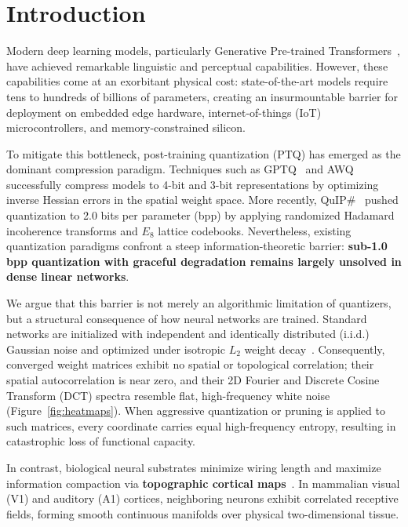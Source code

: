 \documentclass[11pt,a4paper]{article}
\begin{document}
\newpage

\section{Introduction}
\label{sec:intro}

Modern deep learning models, particularly Generative Pre-trained Transformers~\citep[GPT;][]{vaswani2017attention}, have achieved remarkable linguistic and perceptual capabilities. However, these capabilities come at an exorbitant physical cost: state-of-the-art models require tens to hundreds of billions of parameters, creating an insurmountable barrier for deployment on embedded edge hardware, internet-of-things (IoT) microcontrollers, and memory-constrained silicon.

To mitigate this bottleneck, post-training quantization (PTQ) has emerged as the dominant compression paradigm. Techniques such as GPTQ~\citep{frantar2022gptq} and AWQ~\citep{lin2023awq} successfully compress models to 4-bit and 3-bit representations by optimizing inverse Hessian errors in the spatial weight space. More recently, QuIP\#~\citep{chee2024quip} pushed quantization to 2.0 bits per parameter (bpp) by applying randomized Hadamard incoherence transforms and $E_8$ lattice codebooks. 
Nevertheless, existing quantization paradigms confront a steep information-theoretic barrier: \textbf{sub-1.0 bpp quantization with graceful degradation remains largely unsolved in dense linear networks}.

We argue that this barrier is not merely an algorithmic limitation of quantizers, but a structural consequence of how neural networks are trained. Standard networks are initialized with independent and identically distributed (i.i.d.) Gaussian noise and optimized under isotropic $L_2$ weight decay~\citep{loshchilov2017decoupled}. Consequently, converged weight matrices exhibit no spatial or topological correlation; their spatial autocorrelation is near zero, and their 2D Fourier and Discrete Cosine Transform (DCT) spectra resemble flat, high-frequency white noise (Figure~\ref{fig:heatmaps}). When aggressive quantization or pruning is applied to such matrices, every coordinate carries equal high-frequency entropy, resulting in catastrophic loss of functional capacity.

In contrast, biological neural substrates minimize wiring length and maximize information compaction via \textbf{topographic cortical maps}~\citep{hubel1962receptive,durbin1990dimension,kohonen1982self}. In mammalian visual (V1) and auditory (A1) cortices, neighboring neurons exhibit correlated receptive fields, forming smooth continuous manifolds over physical two-dimensional tissue.
\end{document}
